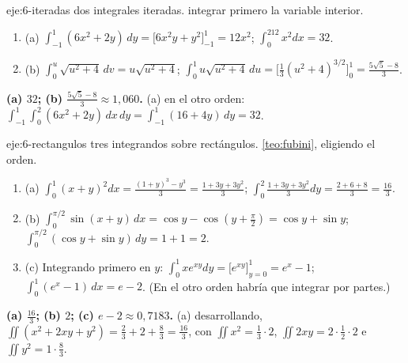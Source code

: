 \begin{solucion}{eje:6-iteradas}
\datos dos integrales iteradas.
\planteamiento integrar primero la variable interior.
\pasos
\begin{enumerate}[label=\arabic*.]
  \item (a) $\int_{-1}^1(6x^2+2y)\,dy=\bigl[6x^2y+y^2\bigr]_{-1}^{1}=12x^2$; $\int_0^212x^2dx=32$.
  \item (b) $\int_0^u\sqrt{u^2+4}\,dv=u\sqrt{u^2+4}$; $\int_0^1u\sqrt{u^2+4}\,du=\bigl[\frac13(u^2+4)^{3/2}\bigr]_0^1=\frac{5\sqrt5-8}{3}$.
\end{enumerate}
\resultado \textbf{(a) $32$; (b) $\frac{5\sqrt5-8}{3}\approx1{,}060$.}
\comprobacion (a) en el otro orden: $\int_{-1}^1\int_0^2(6x^2+2y)\,dx\,dy=\int_{-1}^1(16+4y)\,dy=32$.
\end{solucion}

\begin{solucion}{eje:6-rectangulos}
\datos tres integrandos sobre rectángulos.
\planteamiento \cref{teo:fubini}, eligiendo el orden.
\pasos
\begin{enumerate}[label=\arabic*.]
  \item (a) $\int_0^1(x+y)^2dx=\frac{(1+y)^3-y^3}{3}=\frac{1+3y+3y^2}{3}$; $\int_0^2\frac{1+3y+3y^2}3dy=\frac{2+6+8}{3}=\frac{16}3$.
  \item (b) $\int_0^{\pi/2}\sin(x+y)\,dx=\cos y-\cos(y+\frac\pi2)=\cos y+\sin y$; $\int_0^{\pi/2}(\cos y+\sin y)\,dy=1+1=2$.
  \item (c) Integrando primero en $y$: $\int_0^1xe^{xy}dy=\bigl[e^{xy}\bigr]_{y=0}^{1}=e^x-1$; $\int_0^1(e^x-1)\,dx=e-2$. (En el otro orden habría que integrar por partes.)
\end{enumerate}
\resultado \textbf{(a) $\frac{16}3$; (b) $2$; (c) $e-2\approx0{,}7183$.}
\comprobacion (a) desarrollando, $\iint(x^2+2xy+y^2)=\frac23+2+\frac83=\frac{16}{3}$, con $\iint x^2=\frac13\cdot2$, $\iint2xy=2\cdot\frac12\cdot2$ e $\iint y^2=1\cdot\frac83$.
\end{solucion}

